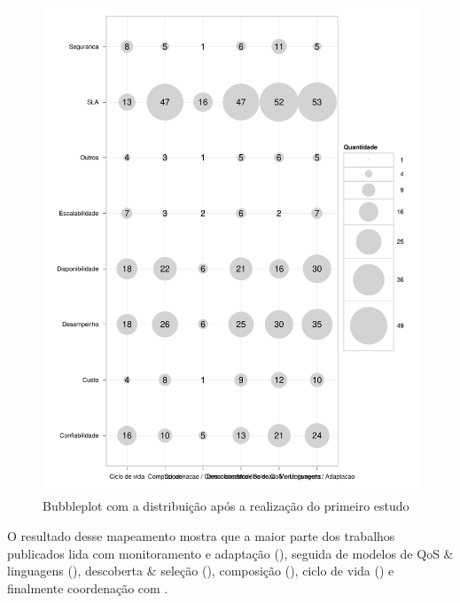 \begin{figure}[htb]
\centering
\includegraphics[scale=0.55]{imagens/contribuicaoContexto.pdf}
\caption{Bubbleplot com a distribui\c{c}\~{a}o ap\'{o}s a realiza\c{c}\~{a}o do primeiro  estudo}
\label{fig:bubbleplot-QoSSOC}
\end{figure}

O resultado desse mapeamento mostra que a maior parte dos trabalhos publicados lida com monitoramento e adapta\c{c}\~{a}o (\MonitoramentoAdaptacao), seguida de modelos de QoS \& linguagens (\ModelosdeQoSeLinguagens), descoberta \& sele\c{c}\~{a}o (\DescobrimentoSelecao),  composi\c{c}\~{a}o (\Composicao), ciclo de vida (\Ciclodevida) e finalmente coordenação com \CoodenacaoComunicacao.

